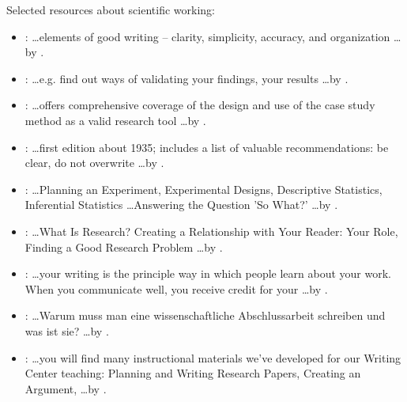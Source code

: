 Selected resources about scientific working:
\begin{itemize}
  \item \emph{}: \ldots elements of good writing
      -- clarity, simplicity, accuracy, and organization \ldots by
      \cite{Zobel:2004}.

  \item \emph{ }: \ldots e.g. find out ways of validating your findings, your results \ldots by \cite{Shaw:2002}.


  \item \emph{}: \ldots offers comprehensive coverage of
      the design and use of the case study method as a valid research tool
      \ldots by \cite{Yin:2013}.

  \item \emph{}: \ldots first edition about 1935;
      includes a list of valuable recommendations: be clear, do not overwrite
      \ldots by \cite{Strunk:2000}.

  \item \emph{}: \ldots Planning an Experiment,
      Experimental Designs, Descriptive Statistics, Inferential Statistics
      \ldots Answering the Question 'So What?' \ldots by \cite{Field:2003}.

  \item \emph{}: \ldots What Is Research? Creating a
      Relationship with Your Reader: Your Role, Finding a Good Research
      Problem \ldots by \cite{Booth:2008}.

  \item \emph{}: \ldots your writing is the principle
      way in which people learn about your work. When you communicate well,
      you receive credit for your \ldots by \cite{Alley:1998}.

  \item \emph{}: \ldots Warum muss man eine
      wissenschaftliche Abschlussarbeit schreiben und was ist sie? \ldots by
      \cite{Eco:2010}.

  \item \emph{}: \ldots you will find many
      instructional materials we've developed for our Writing Center
      teaching: Planning and Writing Research Papers, Creating an Argument,
      \ldots by \cite{Wisconsin:2004}.

\end{itemize}

